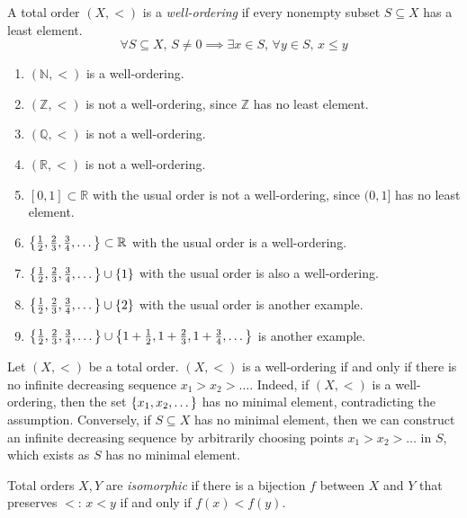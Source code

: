\begin{definition}
    A total order \( (X, <) \) is a \emph{well-ordering} if every nonempty subset \( S \subseteq X \) has a least element.
    \[ \forall S \subseteq X,\, S \neq 0 \implies \exists x \in S,\, \forall y \in S,\, x \leq y \]
\end{definition}
\begin{example}
    \begin{enumerate}
        \item \( (\mathbb N, <) \) is a well-ordering.
        \item \( (\mathbb Z, <) \) is not a well-ordering, since \( \mathbb Z \) has no least element.
        \item \( (\mathbb Q, <) \) is not a well-ordering.
        \item \( (\mathbb R, <) \) is not a well-ordering.
        \item \( [0,1] \subset \mathbb R \) with the usual order is not a well-ordering, since \( (0,1] \) has no least element.
        \item \( \qty{\frac{1}{2}, \frac{2}{3}, \frac{3}{4}, \dots} \subset \mathbb R \) with the usual order is a well-ordering.
        \item \( \qty{\frac{1}{2}, \frac{2}{3}, \frac{3}{4}, \dots} \cup \qty{1} \) with the usual order is also a well-ordering.
        \item \( \qty{\frac{1}{2}, \frac{2}{3}, \frac{3}{4}, \dots} \cup \qty{2} \) with the usual order is another example.
        \item \( \qty{\frac{1}{2}, \frac{2}{3}, \frac{3}{4}, \dots} \cup \qty{1 + \frac{1}{2}, 1 + \frac{2}{3}, 1 + \frac{3}{4}, \dots} \) is another example.
    \end{enumerate}
\end{example}
\begin{remark}
    Let \( (X, <) \) be a total order.
    \( (X, <) \) is a well-ordering if and only if there is no infinite decreasing sequence \( x_1 > x_2 > \dots \).
    Indeed, if \( (X, <) \) is a well-ordering, then the set \( \qty{x_1, x_2, \dots} \) has no minimal element, contradicting the assumption.
    Conversely, if \( S \subseteq X \) has no minimal element, then we can construct an infinite decreasing sequence by arbitrarily choosing points \( x_1 > x_2 > \dots \) in \( S \), which exists as \( S \) has no minimal element.
\end{remark}
\begin{definition}
    Total orders \( X, Y \) are \emph{isomorphic} if there is a bijection \( f \) between \( X \) and \( Y \) that preserves \( < \): \( x < y \) if and only if \( f(x) < f(y) \).
\end{definition}
